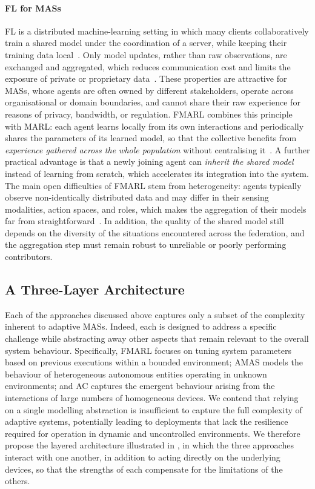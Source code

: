 \paragraph{\acl{FL} for \aclp{MAS}}
\ac{FL}
is a distributed machine-learning setting in which
many clients collaboratively train a shared model
under the coordination of a server,
while keeping their training data local~\cite{mcmahan2017communication}.
%
Only model updates, rather than raw observations,
are exchanged and aggregated,
which
reduces communication cost
and
limits the exposure of private or proprietary data~\cite{kairouz2021advances}.
%
These properties are attractive for \acp{MAS},
whose agents are often owned by different
stakeholders, operate across organisational or domain boundaries,
and
cannot share their raw experience for reasons of
privacy, bandwidth, or regulation.
%
\ac{FMARL} combines this principle with \ac{MARL}:
each agent learns locally from its own interactions
and
periodically shares the parameters of its learned model,
so that the collective benefits from
\emph{experience gathered across the whole population}
without centralising it~\cite{jing2025federated}.
%
A further practical advantage is that
a newly joining agent can \emph{inherit the shared model}
instead of learning from scratch,
which
accelerates its integration into the system.
%
The main open difficulties of \ac{FMARL} stem from heterogeneity:
agents typically observe non-identically distributed data
and may differ in their
sensing modalities, action spaces, and roles,
which
makes the aggregation of their models
far from straightforward~\cite{kairouz2021advances,jing2025federated}.
%
In addition,
the quality of the shared model still depends on
the diversity of the situations encountered across the federation,
and
the aggregation step must remain robust to unreliable or poorly performing contributors.

\subsection{A Three-Layer Architecture}
\label{sec:perspectives-sissy-architecture}

Each of the approaches discussed above captures only a subset of the complexity inherent to adaptive \acp{MAS}.
%
Indeed,
each is designed to address a specific challenge
while abstracting away other aspects
that remain relevant to the overall system behaviour.
%
Specifically,
\ac{FMARL}
focuses on tuning system parameters based on
previous executions within a bounded environment;
%
\ac{AMAS}
models the behaviour of heterogeneous autonomous entities
operating in unknown environments;
%
and
\ac{AC}
captures the emergent behaviour arising from the interactions
of large numbers of homogeneous devices.
%
We contend that relying on a single modelling abstraction
is insufficient to capture the full complexity of adaptive systems,
potentially leading to
deployments that lack the resilience required
for operation in dynamic and uncontrolled environments.
%
We therefore propose
the layered architecture illustrated in ,
in which the three approaches interact with one another,
in addition to acting directly on the underlying devices,
so that the strengths of each compensate for the limitations of the others.

